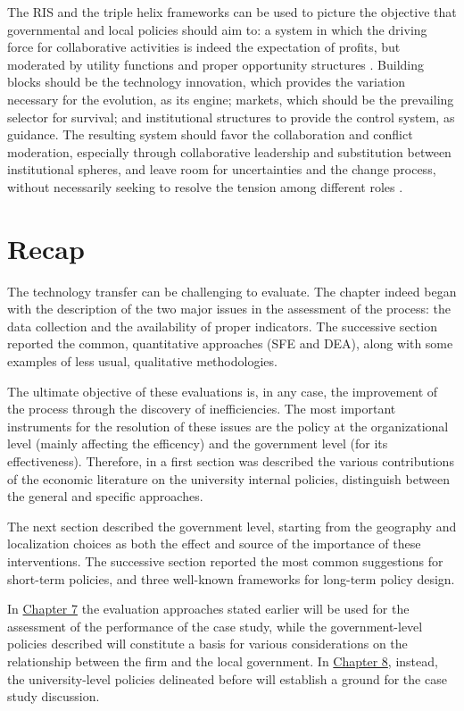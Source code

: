 The RIS and the triple helix frameworks can be used to picture the objective that governmental and local policies should aim to: a system in which the driving force for collaborative activities is indeed the expectation of profits, but moderated by utility functions and proper opportunity structures \citep{Etzkowitz2000}. Building blocks should be the technology innovation, which provides the variation necessary for the evolution, as its engine; markets, which should be the prevailing selector for survival; and institutional structures to provide the control system, as guidance. The resulting system should favor the collaboration and conflict moderation, especially through collaborative leadership and substitution between institutional spheres, and leave room for uncertainties and the change process, without necessarily seeking to resolve the tension among different roles \citep{Ranga2013}. 

\section{Recap}

The technology transfer can be challenging to evaluate. The chapter indeed began with the description of the two major issues in the assessment of the process: the data collection and the availability of proper indicators. The successive section reported the common, quantitative approaches (SFE and DEA), along with some examples of less usual, qualitative methodologies.

The ultimate objective of these evaluations is, in any case, the improvement of the process through the discovery of inefficiencies. The most important instruments for the resolution of these issues are the policy at the organizational level (mainly affecting the efficency) and the government level (for its effectiveness). Therefore, in a first section was described the various contributions of the economic literature on the university internal policies, distinguish between the general and specific approaches.

The next section described the government level, starting from the geography and localization choices as both the effect and source of the importance of these interventions. The successive section reported the most common suggestions for short-term policies, and three well-known frameworks for long-term policy design.

In \hyperref[Chapter7]{Chapter 7} the evaluation approaches stated earlier will be used for the assessment of the performance of the case study, while the government-level policies described will constitute a basis for various considerations on the relationship between the firm and the local government. In \hyperref[Chapter8]{Chapter 8}, instead, the university-level policies delineated before will establish a ground for the case study discussion.  